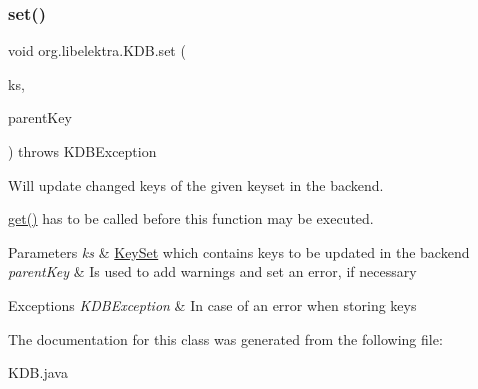 \subsubsection{\texorpdfstring{set()}{set()}}
{\footnotesize\ttfamily void org.\+libelektra.\+K\+D\+B.\+set (\begin{DoxyParamCaption}\item[{final \hyperlink{classorg_1_1libelektra_1_1KeySet}{Key\+Set}}]{ks,  }\item[{final \hyperlink{classorg_1_1libelektra_1_1Key}{Key}}]{parent\+Key }\end{DoxyParamCaption}) throws K\+D\+B\+Exception\hspace{0.3cm}{\ttfamily [inline]}}



Will update changed keys of the given keyset in the backend. 

\hyperlink{classorg_1_1libelektra_1_1KDB_a600abc786bde91a3122bd96be991a3d5}{get()} has to be called before this function may be executed.


\begin{DoxyParams}{Parameters}
{\em ks} & \hyperlink{classorg_1_1libelektra_1_1KeySet}{Key\+Set} which contains keys to be updated in the backend \\
\hline
{\em parent\+Key} & Is used to add warnings and set an error, if necessary \\
\hline
\end{DoxyParams}

\begin{DoxyExceptions}{Exceptions}
{\em K\+D\+B\+Exception} & In case of an error when storing keys \\
\hline
\end{DoxyExceptions}


The documentation for this class was generated from the following file\+:\begin{DoxyCompactItemize}
\item 
K\+D\+B.\+java\end{DoxyCompactItemize}
